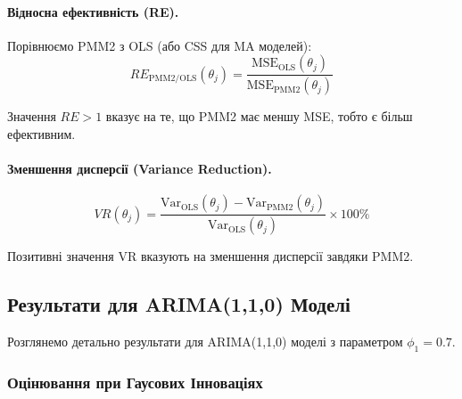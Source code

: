 \documentclass[12pt,a4paper]{article}
\begin{document}
	\paragraph{Відносна ефективність (RE).}
	
	Порівнюємо PMM2 з OLS (або CSS для MA моделей):
	\begin{equation}
		\label{eq:relative_efficiency_empirical}
		RE_{\text{PMM2/OLS}}(\theta_j) = \frac{\text{MSE}_{\text{OLS}}(\theta_j)}{\text{MSE}_{\text{PMM2}}(\theta_j)}
	\end{equation}
	
	Значення $RE > 1$ вказує на те, що PMM2 має меншу MSE, тобто є більш ефективним.
	
	\paragraph{Зменшення дисперсії (Variance Reduction).}
	\begin{equation}
		\label{eq:variance_reduction}
		VR(\theta_j) = \frac{\text{Var}_{\text{OLS}}(\theta_j) - \text{Var}_{\text{PMM2}}(\theta_j)}{\text{Var}_{\text{OLS}}(\theta_j)} \times 100\%
	\end{equation}
	
	Позитивні значення VR вказують на зменшення дисперсії завдяки PMM2.
	
	\subsection{Результати для ARIMA(1,1,0) Моделі}
	\label{subsec:results_arima110}
	
	Розглянемо детально результати для ARIMA(1,1,0) моделі з параметром $\phi_1 = 0.7$.
	
	\subsubsection{Оцінювання при Гаусових Інноваціях}
	
\end{document}
